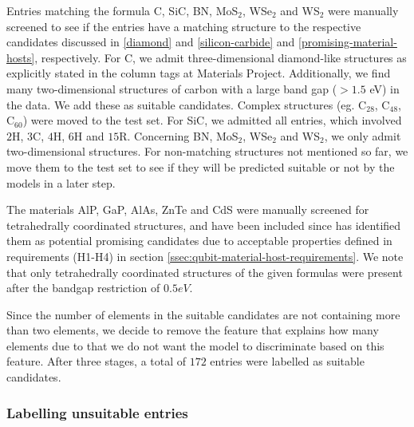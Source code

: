 Entries matching the formula C, SiC, BN, MoS$_2$, WSe$_2$ and WS$_2$ were manually screened to see if the entries have a matching structure to the respective candidates discussed in \autoref{diamond} and \ref{silicon-carbide} and \ref{promising-material-hosts}, respectively.
For C, we admit three-dimensional diamond-like structures as explicitly stated in the column tags at Materials Project. Additionally, we find many two-dimensional structures of carbon with a large band gap ($>1.5$ eV) in the data. We add these as suitable candidates. Complex structures (eg. C$_{28}$, C$_{48}$, C$_{60}$) were moved to the test set. For SiC, we admitted all entries, which involved $2$H, $3$C, $4$H, $6$H and $15$R. Concerning BN, MoS$_2$, WSe$_2$ and  WS$_2$, we only admit two-dimensional structures. For non-matching structures not mentioned so far, we move them to the test set to see if they will be predicted suitable or not by the models in a later step.



The materials AlP, GaP, AlAs, ZnTe and CdS were manually screened for tetrahedrally coordinated structures, and have been included since \citeauthor{Weber2010} \cite{Weber2010} has identified them as potential promising candidates due to acceptable properties defined in requirements (H1-H4) in section \autoref{ssec:qubit-material-host-requirements}. We note that only tetrahedrally coordinated structures of the given formulas were present after the bandgap restriction of $0.5eV$.

Since the number of elements in the suitable candidates are not containing more than two elements, we decide to remove the feature that explains how many elements due to that we do not want the model to discriminate based on this feature. After three stages, a total of $172$ entries were labelled as suitable candidates.

\subsubsection{Labelling unsuitable entries}

